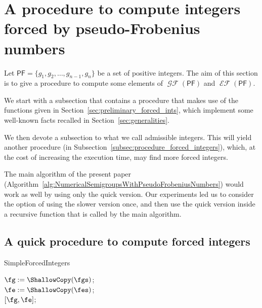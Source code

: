 \documentclass[11pt]{amsart}
\theoremstyle{remark}
\begin{document}
\section{A procedure to compute integers forced by pseudo-Frobenius numbers}
\label{sec:computing_forced_ints}
Let ${\ensuremath{\mathsf{PF}}}= \{g_1,g_2,\ldots,g_{n-1},g_n\}$ be a set of positive integers. The aim of this section is to give a procedure to compute some elements of $\operatorname{\mathcal{GF}}({\ensuremath{\mathsf{PF}}})$ and $\operatorname{\mathcal{EF}}({\ensuremath{\mathsf{PF}}})$.

We start with a subsection that contains a procedure that makes use of the functions given in Section~\ref{sec:preliminary_forced_ints}, which implement some well-known facts recalled in Section~\ref{sec:generalities}.

We then devote a subsection to what we call admissible integers. This will yield another procedure (in Subsection~\ref{subsec:procedure_forced_integers}), which, at the cost of increasing the execution time, may find more forced integers.

The main algorithm of the present paper (Algorithm~\ref{alg:NumericalSemigroupsWithPseudoFrobeniusNumbers}) would work as well by using only the quick version. Our experiments led us to consider the option of using the slower version once, and then use the quick version inside a recursive function that is called by the main algorithm.

\subsection{A quick procedure to compute forced integers}
\label{subsec:quick_forced_integers}

\begin{algorithm}[ht]\caption{SimpleForcedIntegers\label{alg:SimpleForcedIntegers}}
\BlankLine
$\fg := \ShallowCopy(\fgs)$; \\
$\fe := \ShallowCopy(\fes)$; \\
\Return $[\fg,\fe]$;
\end{algorithm}
\end{document}
